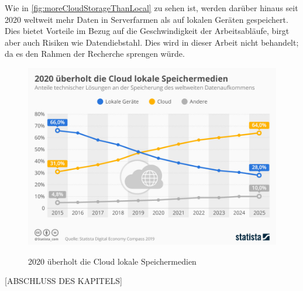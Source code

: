 Wie in \autoref{fig:moreCloudStorageThanLocal} zu sehen ist, werden darüber hinaus seit 2020 weltweit mehr Daten in Serverfarmen als auf lokalen Geräten gespeichert. Dies bietet Vorteile im Bezug auf die Geschwindigkeit der Arbeitsabläufe, birgt aber auch Risiken wie Datendiebstahl. Dies wird in dieser Arbeit nicht behandelt; da es den Rahmen der Recherche sprengen würde.
\begin{figure}[h!]
      \centering
      \includegraphics[scale=0.4]{sources/moreCloudStorageThanLocal}
      \caption[2020 überholt die Cloud lokale Speichermedien]{}\label{fig:moreCloudStorageThanLocal}
      2020 überholt die Cloud lokale Speichermedien
            {\cite{STA1}}
\end{figure}

[ABSCHLUSS DES KAPITELS]
\newpage


